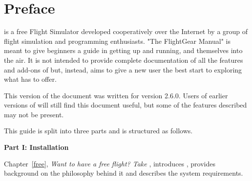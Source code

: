 
\chapter*{Preface}
\label{preface}

\FlightGear{} is a free Flight Simulator developed cooperatively over the Internet
by a group of flight simulation and programming enthusiasts. "The
FlightGear Manual" is meant to give beginners a guide in getting
\FlightGear{} up and running, and themselves into the air. It is not
intended to provide complete documentation of all the features and
add-ons of \FlightGear{} but, instead, aims to give a new user the best
start to exploring what \FlightGear{} has to offer.

This version of the document was written for \FlightGear{} version 2.6.0.
Users of earlier versions of \FlightGear{} will still find this document
useful, but some of the features described may not be present.

This guide is split into three parts and is structured as follows.

\medskip

\noindent
\textbf{Part I: Installation}
\medskip

 \noindent
Chapter~\ref{free}, \textit{Want to have a free flight? Take \FlightGear{}}, introduces
\FlightGear{}, provides background on the philosophy behind it and describes the system requirements.
 \medskip

